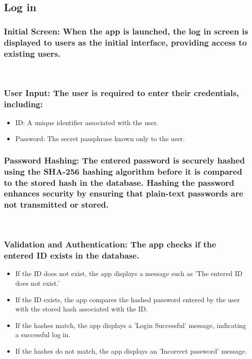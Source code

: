 \documentclass[conference]{IEEEtran}
\begin{document}
\subsection{Log in}

\subsubsection{Initial Screen: When the app is launched, the log in screen is displayed to users as the initial interface, providing access to existing users.}

\
\subsubsection{User Input: The user is required to enter their credentials, including:}
\begin{itemize}
    \item ID: A unique identifier associated with the user. \\
    \item Password: The secret passphrase known only to the user. \\
\end{itemize}

\subsubsection{Password Hashing: The entered password is securely hashed using the SHA-256 hashing algorithm before it is compared to the stored hash in the database. Hashing the password enhances security by ensuring that plain-text passwords are not transmitted or stored.}

\
\subsubsection{Validation and Authentication: The app checks if the entered ID exists in the database.}
\begin{itemize}
    \item If the ID does not exist, the app displays a message such as 'The entered ID does not exist.' \\
    \item If the ID exists, the app compares the hashed password entered by the user with the stored hash associated with the ID. \\
    \item If the hashes match, the app displays a 'Login Successful' message, indicating a successful log in. \\
    \item If the hashes do not match, the app displays an 'Incorrect password' message.\\
\end{itemize}
\end{document}
